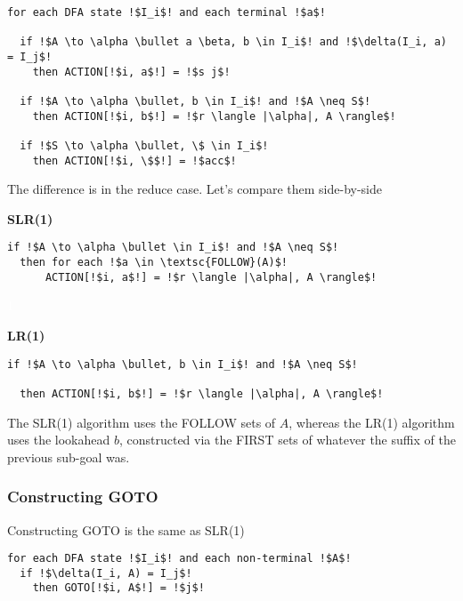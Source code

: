 \begin{code}
\begin{lstlisting}[style=pseudocode]
for each DFA state !$I_i$! and each terminal !$a$!

  if !$A \to \alpha \bullet a \beta, b \in I_i$! and !$\delta(I_i, a) = I_j$! 
    then ACTION[!$i, a$!] = !$s j$!
    
  if !$A \to \alpha \bullet, b \in I_i$! and !$A \neq S$! 
    then ACTION[!$i, b$!] = !$r \langle |\alpha|, A \rangle$!
      
  if !$S \to \alpha \bullet, \$ \in I_i$! 
    then ACTION[!$i, \$$!] = !$acc$!
\end{lstlisting}
\vspace{1mm}
\end{code}

The difference is in the reduce case. Let's compare them side-by-side

\begin{minipage}[t]{0.49\textwidth}
\textbf{SLR(1)}
\begin{lstlisting}[style=pseudocode]
if !$A \to \alpha \bullet \in I_i$! and !$A \neq S$! 
  then for each !$a \in \textsc{FOLLOW}(A)$!
      ACTION[!$i, a$!] = !$r \langle |\alpha|, A \rangle$!
\end{lstlisting}
\end{minipage}%
\begin{minipage}[t]{0.02\textwidth}
\textcolor{white}{1}
\end{minipage}%
\begin{minipage}[t]{0.49\textwidth}
\textbf{LR(1)}
 \begin{lstlisting}[style=pseudocode]
if !$A \to \alpha \bullet, b \in I_i$! and !$A \neq S$! 
  
  then ACTION[!$i, b$!] = !$r \langle |\alpha|, A \rangle$!
\end{lstlisting}
\end{minipage}

The SLR(1) algorithm uses the FOLLOW sets of $A$, whereas the LR(1) algorithm uses the lookahead $b$, constructed via the FIRST sets of whatever the suffix of the previous sub-goal was.

\subsubsection{Constructing GOTO}
Constructing GOTO is the same as SLR(1)

\begin{code}
\begin{lstlisting}[style=pseudocode]
for each DFA state !$I_i$! and each non-terminal !$A$!
  if !$\delta(I_i, A) = I_j$! 
    then GOTO[!$i, A$!] = !$j$!
\end{lstlisting}
\vspace{1mm}
\end{code}

